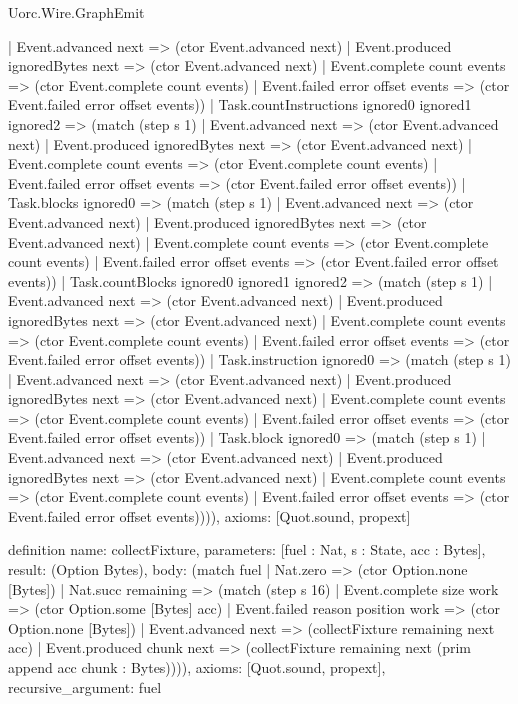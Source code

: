 \begin{lexlean}{Uorc.Wire.GraphEmit}
\begin{semanticmodule}
{        | Event.advanced next => (ctor Event.advanced next)
        | Event.produced ignoredBytes next => (ctor Event.advanced next)
        | Event.complete count events => (ctor Event.complete count events)
        | Event.failed error offset events => (ctor Event.failed error offset events))
      | Task.countInstructions ignored0 ignored1 ignored2 => (match (step s 1)
        | Event.advanced next => (ctor Event.advanced next)
        | Event.produced ignoredBytes next => (ctor Event.advanced next)
        | Event.complete count events => (ctor Event.complete count events)
        | Event.failed error offset events => (ctor Event.failed error offset events))
      | Task.blocks ignored0 => (match (step s 1)
        | Event.advanced next => (ctor Event.advanced next)
        | Event.produced ignoredBytes next => (ctor Event.advanced next)
        | Event.complete count events => (ctor Event.complete count events)
        | Event.failed error offset events => (ctor Event.failed error offset events))
      | Task.countBlocks ignored0 ignored1 ignored2 => (match (step s 1)
        | Event.advanced next => (ctor Event.advanced next)
        | Event.produced ignoredBytes next => (ctor Event.advanced next)
        | Event.complete count events => (ctor Event.complete count events)
        | Event.failed error offset events => (ctor Event.failed error offset events))
      | Task.instruction ignored0 => (match (step s 1)
        | Event.advanced next => (ctor Event.advanced next)
        | Event.produced ignoredBytes next => (ctor Event.advanced next)
        | Event.complete count events => (ctor Event.complete count events)
        | Event.failed error offset events => (ctor Event.failed error offset events))
      | Task.block ignored0 => (match (step s 1)
        | Event.advanced next => (ctor Event.advanced next)
        | Event.produced ignoredBytes next => (ctor Event.advanced next)
        | Event.complete count events => (ctor Event.complete count events)
        | Event.failed error offset events => (ctor Event.failed error offset events)))),
  axioms: [Quot.sound, propext]
}

definition{
  name: collectFixture,
  parameters: [fuel : Nat, s : State, acc : Bytes],
  result: (Option Bytes),
  body: (match fuel
    | Nat.zero => (ctor Option.none [Bytes])
    | Nat.succ remaining => (match (step s 16)
      | Event.complete size work => (ctor Option.some [Bytes] acc)
      | Event.failed reason position work => (ctor Option.none [Bytes])
      | Event.advanced next => (collectFixture remaining next acc)
      | Event.produced chunk next => (collectFixture remaining next (prim append acc chunk : Bytes)))),
  axioms: [Quot.sound, propext],
  recursive_argument: fuel
}


\end{semanticmodule}
\end{lexlean}
